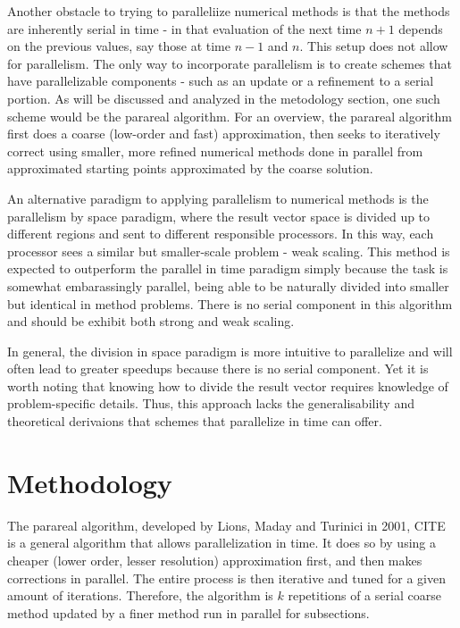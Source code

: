 \documentclass[letterpaper,twocolumn,11pt]{article}
\begin{document}
Another obstacle to trying to paralleliize numerical methods is that the methods are inherently serial in time - in that evaluation of the next time $n+1$ depends on the previous values, say those at time $n-1$ and $n$.  This setup does not allow for parallelism.  The only way to incorporate parallelism is to create schemes that have parallelizable components - such as an update or a refinement to a serial portion.  As will be discussed and analyzed in the metodology section, one such scheme would be the parareal algorithm.  For an overview, the parareal algorithm first does a coarse (low-order and fast) approximation, then seeks to iteratively correct using smaller, more refined numerical methods done in parallel from approximated starting points approximated by the coarse solution.

An alternative paradigm to applying parallelism to numerical methods is the parallelism by space paradigm, where the result vector space is divided up to different regions and sent to different responsible processors.  In this way, each processor sees a similar but smaller-scale problem - weak scaling.  This method is expected to outperform the parallel in time paradigm simply because the task is somewhat embarassingly parallel, being able to be naturally divided into smaller but identical in method problems.  There is no serial component in this algorithm and should be exhibit both strong and weak scaling.

In general, the division in space paradigm is more intuitive to parallelize and will often lead to greater speedups because there is no serial component.  Yet it is worth noting that knowing how to divide the result vector requires knowledge of problem-specific details.  Thus, this approach lacks the generalisability and theoretical derivaions that schemes that parallelize in time can offer.

\section{Methodology}

The parareal algorithm, developed by Lions, Maday and Turinici in 2001, CITE is
a general algorithm that allows parallelization in time.  It does so by using a
cheaper (lower order, lesser resolution) approximation first, and then makes
corrections in parallel. The entire process is then iterative and tuned for a
given amount of iterations. Therefore, the algorithm is $k$ repetitions of a
serial coarse method updated by a finer method run in parallel for subsections.
\end{document}
